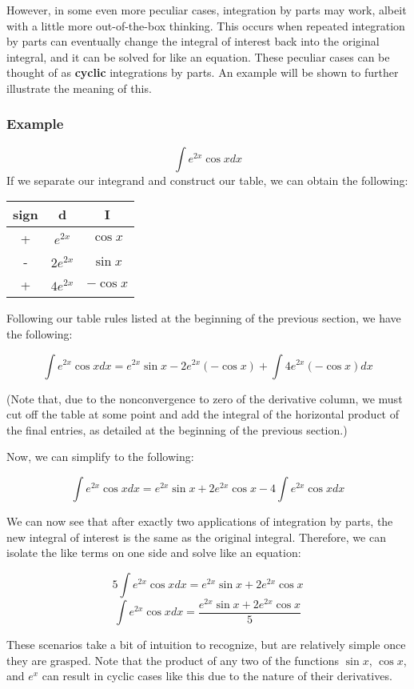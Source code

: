 \documentclass[11pt]{article}
\begin{document}
However, in some even more peculiar cases, integration by parts may work, albeit with a little more out-of-the-box thinking. This occurs when repeated integration by parts can eventually change the integral of interest back into the original integral, and it can be solved for like an equation. These peculiar cases can be thought of as \textbf{cyclic} integrations by parts. An example will be shown to further illustrate the meaning of this.

\subsubsection*{Example}
\[ \int e^{2x}\cos x dx \]
If we separate our integrand and construct our table, we can obtain the following:

\begin{table}[H]
    \centering
    \begin{tabular}{c|c|c}
        sign & d & I \\
        \hline
        + & $e^{2x}$ & $\cos x$ \\
        - & $2e^{2x}$ & $\sin x$\\
        + & $4e^{2x}$ & $- \cos x$ 
    \end{tabular}
\end{table}

Following our table rules listed at the beginning of the previous section, we have the following: 

\[ \int e^{2x}\cos x dx = e^{2x}\sin x - 2e^{2x}(-\cos x) + \int 4e^{2x}(-\cos x) dx\]

(Note that, due to the nonconvergence to zero of the derivative column, we must cut off the table at some point and add the integral of the horizontal product of the final entries, as detailed at the beginning of the previous section.)

Now, we can simplify to the following:

\[ \int e^{2x}\cos x dx = e^{2x}\sin x + 2e^{2x}\cos x - 4\int e^{2x}\cos x dx\]

We can now see that after exactly two applications of integration by parts, the new integral of interest is the same as the original integral. Therefore, we can isolate the like terms on one side and solve like an equation:

\[ 5 \int e^{2x}\cos x dx = e^{2x}\sin x + 2e^{2x}\cos x \]
\[ \int e^{2x}\cos x dx = \frac{e^{2x}\sin x + 2e^{2x}\cos x}{5}\]

These scenarios take a bit of intuition to recognize, but are relatively simple once they are grasped. Note that the product of any two of the functions $\sin x$, $\cos x$, and $e^x$ can result in cyclic cases like this due to the nature of their derivatives.
\end{document}

